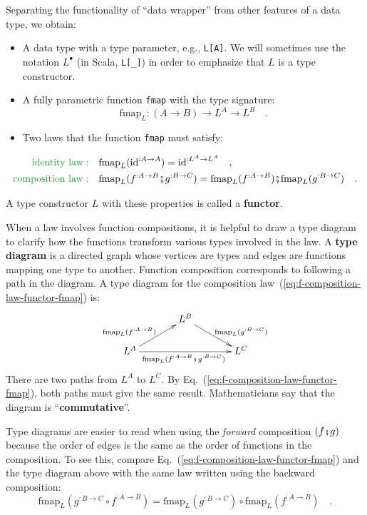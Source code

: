 Separating the functionality of \textsf{``}data wrapper\textsf{''} from other features
of a data type, we obtain:
\begin{itemize}
\item A data type with a type parameter, e.g., \lstinline!L[A]!. We will
sometimes use the notation $L^{\bullet}$ (in Scala, \lstinline!L[_]!)
in order to emphasize that $L$ is a type constructor.
\item A fully parametric function \lstinline!fmap!
with the type signature:
\[
\text{fmap}_{L}:\left(A\rightarrow B\right)\rightarrow L^{A}\rightarrow L^{B}\quad.
\]
\item Two laws that the function \lstinline!fmap! must satisfy:
\end{itemize}
\begin{align}
{\color{greenunder}\text{identity law}:}\quad & \text{fmap}_{L}(\text{id}^{:A\rightarrow A})=\text{id}^{:L^{A}\rightarrow L^{A}}\quad,\label{eq:f-identity-law-functor-fmap}\\
{\color{greenunder}\text{composition law}:}\quad & \text{fmap}_{L}(f^{:A\rightarrow B}\bef g^{:B\rightarrow C})=\text{fmap}_{L}(f^{:A\rightarrow B})\bef\text{fmap}_{L}(g^{:B\rightarrow C})\quad.\label{eq:f-composition-law-functor-fmap}
\end{align}

A type constructor $L$ with these properties is called a \textbf{functor}. 

When a law involves function compositions, it is helpful to draw a
type diagram to clarify how the functions transform
various types involved in the law. A \textbf{type diagram}
is a directed graph whose vertices are types and edges are functions
mapping one type to another. Function composition corresponds to following
a path in the diagram. A type diagram for the composition law~(\ref{eq:f-composition-law-functor-fmap})
is:
\[
\xymatrix{\xyScaleY{1.5pc}\xyScaleX{3pc} & L^{B}\ar[rd]\sp(0.6){~~\text{fmap}_{L}(g^{:B\rightarrow C})}\\
L^{A}\ar[ru]\sp(0.4){\text{fmap}_{L}(f^{:A\rightarrow B})\ ~}\ar[rr]\sb(0.5){\text{fmap}_{L}(f^{:A\rightarrow B}\bef g^{:B\rightarrow C})\ } &  & L^{C}
}
\]
There are two paths from $L^{A}$ to $L^{C}$. By Eq.~(\ref{eq:f-composition-law-functor-fmap}),
both paths must give the same result. Mathematicians say that the
diagram is \textsf{``}\textbf{commutative}\textsf{''}.

Type diagrams are easier to read when using the \emph{forward} composition
$\left(f\bef g\right)$ because the order of edges is the same as
the order of functions in the composition. To see this, compare Eq.~(\ref{eq:f-composition-law-functor-fmap})
and the type diagram above with the same law written using the backward
composition:
\[
\text{fmap}_{L}(g^{:B\rightarrow C}\circ f^{:A\rightarrow B})=\text{fmap}_{L}(g^{:B\rightarrow C})\circ\text{fmap}_{L}(f^{:A\rightarrow B})\quad.
\]

